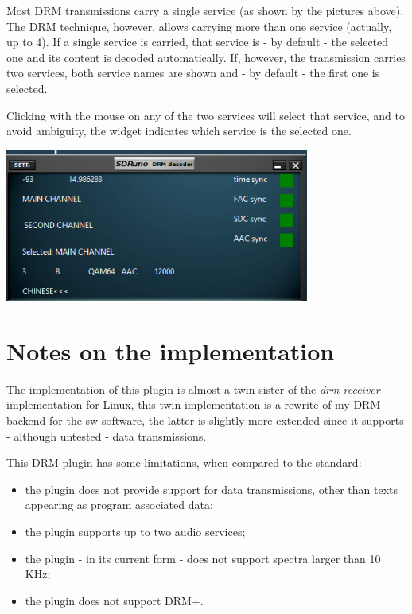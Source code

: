 \documentclass[10pt]{article}
\begin{document}
Most DRM transmissions carry a single service (as shown by the pictures
above).
The DRM technique, however, allows carrying more than one service (actually, up to 4). If a single service is carried, that service is - by default -
the selected one and its content is decoded automatically.
If, however, the transmission carries two services, both service
names are shown and - by default -  the first one is selected.
\par
Clicking with the mouse on any of the two services will select that service,
and to avoid ambiguity, the widget indicates which service is the selected one.

\includegraphics[width=100mm]{drm-two-services.png}

\section {Notes on the implementation}
The implementation of this plugin is almost a twin sister of the
{\em drm-receiver} implementation for Linux, this twin
implementation is a rewrite of my DRM backend for the sw software,
the latter is slightly more extended since it supports - although untested -
data transmissions.
\par
This DRM plugin has some limitations, when compared to the standard:
\begin{itemize}
\item the plugin does not provide support for data transmissions, other than
texts appearing as program associated data;
\item the plugin supports up to two audio services;
\item the plugin - in its current form - does not support spectra larger
than 10 KHz;
\item the plugin does not support DRM+.
\end{itemize}
\end{document}
